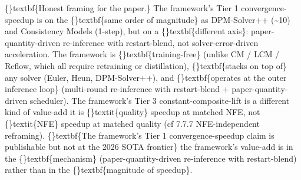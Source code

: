 \documentclass{article}
\begin{document}
\begin{table}[ht]
\centering
\small
{}%
\end{table}

\{\}textbf\{Honest framing for the paper.\} The framework's Tier 1 convergence-speedup is on the \{\}textbf\{same order of magnitude\} as DPM-Solver++ (\textasciitilde{}10) and Consistency Models (1-step), but on a \{\}textbf\{different axis\}: paper-quantity-driven re-inference with restart-blend, not solver-error-driven acceleration. The framework is \{\}textbf\{training-free\} (unlike CM / LCM / Reflow, which all require retraining or distillation), \{\}textbf\{stacks on top of\} any solver (Euler, Heun, DPM-Solver++), and \{\}textbf\{operates at the outer inference loop\} (multi-round re-inference with restart-blend + paper-quantity-driven scheduler). The framework's Tier 3 constant-composite-lift is a different kind of value-add  it is \{\}textit\{quality\} speedup at matched NFE, not \{\}textit\{NFE\} speedup at matched quality (cf 7.7.7 NFE-independent reframing). \{\}textbf\{The framework's Tier 1 convergence-speedup claim is publishable but not at the 2026 SOTA frontier\}  the framework's value-add is in the \{\}textbf\{mechanism\} (paper-quantity-driven re-inference with restart-blend) rather than in the \{\}textbf\{magnitude of speedup\}.
\end{document}
